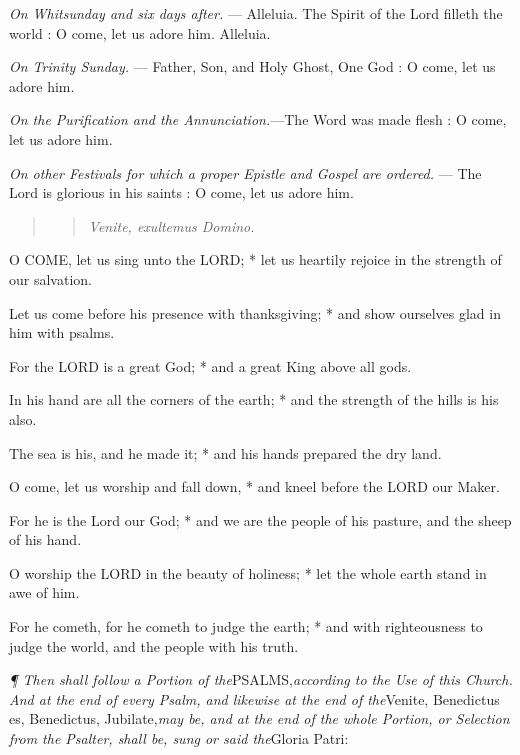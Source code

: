\emph{On Whitsunday and six days after.} —
Alleluia. The Spirit of the Lord filleth the world : O come, let us adore
him. Alleluia.

\emph{On Trinity Sunday.} — Father, Son, and
Holy Ghost, One God : O come, let us adore him.

\emph{On the Purification and the Annunciation.}—The
Word was made flesh : O come, let us adore him.

\emph{On other Festivals for which a proper Epistle and
Gospel are ordered.} — The Lord is glorious in his saints :
O come, let us adore him.

\emph{}\emph{}\emph{} \emph{}

\begin{quote}

\begin{quote}

\emph{Venite,
exultemus Domino.}

\end{quote}

\end{quote}

O
COME, let us sing unto the LORD; * let us heartily
rejoice in the strength of our salvation.

Let us come before his presence with thanksgiving;
* and show ourselves glad in him with psalms.

For the LORD is a great God;
* and a great King above all gods.

In his hand are all the corners of the earth; * and
the strength of the hills is his also.

The sea is his, and he made it; * and his hands prepared
the dry land.

O come, let us worship and fall down, * and kneel before
the LORD our Maker.

For he is the Lord our God; * and we are the people
of his pasture, and the sheep of his hand.

O worship the LORD in the beauty
of holiness; * let the whole earth stand in awe of him.

For he cometh, for he cometh to judge the earth; *
and with righteousness to judge the world, and the people with his truth.

\emph{¶
Then shall follow a Portion of the}PSALMS,\emph{according to the Use of this Church. And at the end of every Psalm, and
likewise at the end of the}Venite, Benedictus es, Benedictus, Jubilate,\emph{may be, and at the end of the whole Portion, or Selection from the Psalter,
shall be, sung or said the}Gloria Patri:

